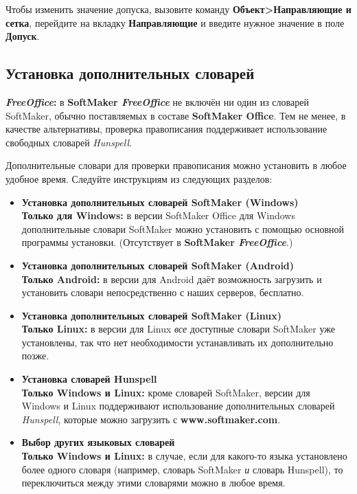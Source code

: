 ﻿\documentclass[a4paper,10pt]{article}
\begin{document}
  Чтобы изменить значение допуска, вызовите команду \textbf{Объект>Направляющие и сетка}, перейдите на вкладку \textbf{Направляющие} и введите нужное значение в поле \textbf{Допуск}.  
 
 \subsection{Установка дополнительных словарей}
 \begin{mdframed}[backgroundcolor=pink!50]
\textbf{\textit{FreeOffice}:} в \textbf{SoftMaker \textit{FreeOffice}} не включён ни один из словарей SoftMaker, обычно поставляемых в составе \textbf{SoftMaker Office}. Тем не менее, в качестве альтернативы, проверка правописания поддерживает использование свободных словарей \textit{Hunspell}.
\end{mdframed}
 
 Дополнительные словари для проверки правописания можно установить в любое удобное время. Следуйте инструкциям из следующих разделов:
 
 \begin{itemize}
  \item \textbf{Установка дополнительных словарей SoftMaker (Windows)}\\
  \textbf{Только для Windows:} в версии SoftMaker Office для Windows дополнительные словари SoftMaker можно установить с помощью основной программы установки. (Отсутствует в \textbf{SoftMaker \textit{FreeOffice}}.)
  \item \textbf{Установка дополнительных словарей SoftMaker (Android)}\\
  \textbf{Только Android:} в версии для Android даёт возможность загрузить и установить словари непосредственно с наших серверов, бесплатно.
  \item \textbf{Установка дополнительных словарей SoftMaker (Linux)}\\
  \textbf{Только Linux:} в версии для Linux \textit{все} доступные словари SoftMaker уже установлены, так что нет необходимости устанавливать их дополнительно позже.
  \item \textbf{Установка словарей Hunspell}\\
  \textbf{Только Windows и Linux:} кроме словарей SoftMaker, версии для Windows и Linux поддерживают использование дополнительных словарей \textit{Hunspell}, которые можно загрузить с \textbf{www.softmaker.com}.
  \item \textbf{Выбор других языковых словарей}\\
  \textbf{Только Windows и Linux:} в случае, если для какого-то языка установлено более одного словаря (например, словарь SoftMaker \textit{и} словарь Hunspell), то переключиться между этими словарями можно в любое время.
 \end{itemize}
\end{document}
